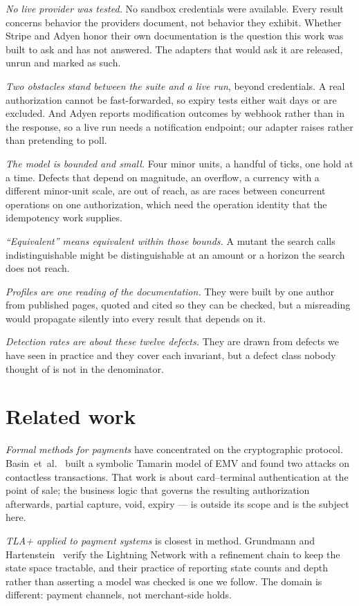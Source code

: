 \documentclass[conference]{IEEEtran}
\begin{document}
\emph{No live provider was tested.} No sandbox credentials were available. Every
result concerns behavior the providers document, not behavior they exhibit.
Whether Stripe and Adyen honor their own documentation is the question this work
was built to ask and has not answered. The adapters that would ask it are
released, unrun and marked as such.

\emph{Two obstacles stand between the suite and a live run}, beyond credentials.
A real authorization cannot be fast-forwarded, so expiry tests either wait days
or are excluded. And Adyen reports modification outcomes by webhook rather than
in the response, so a live run needs a notification endpoint; our adapter raises
rather than pretending to poll.

\emph{The model is bounded and small.} Four minor units, a handful of ticks, one
hold at a time. Defects that depend on magnitude, an overflow, a currency with
a different minor-unit scale, are out of reach, as are races between
concurrent operations on one authorization, which need the operation identity
that the idempotency work supplies.

\emph{``Equivalent'' means equivalent within those bounds.} A mutant the search
calls indistinguishable might be distinguishable at an amount or a horizon the
search does not reach.

\emph{Profiles are one reading of the documentation.} They were built by one
author from published pages, quoted and cited so they can be checked, but a
misreading would propagate silently into every result that depends on it.

\emph{Detection rates are about these twelve defects.} They are drawn from
defects we have seen in practice and they cover each invariant, but a defect
class nobody thought of is not in the denominator.

\section{Related work}

\emph{Formal methods for payments} have concentrated on the cryptographic
protocol. Basin~et~al.~\cite{basin2021emv} built a symbolic Tamarin model of EMV
and found two attacks on contactless transactions. That work is about
card--terminal authentication at the point of sale; the business logic that
governs the resulting authorization afterwards, partial capture, void, expiry
--- is outside its scope and is the subject here.

\emph{TLA+ applied to payment systems} is closest in method. Grundmann and
Hartenstein~\cite{grundmann2023lightning} verify the Lightning Network with a
refinement chain to keep the state space tractable, and their practice of
reporting state counts and depth rather than asserting a model was checked is one
we follow. The domain is different: payment channels, not merchant-side holds.
\end{document}
